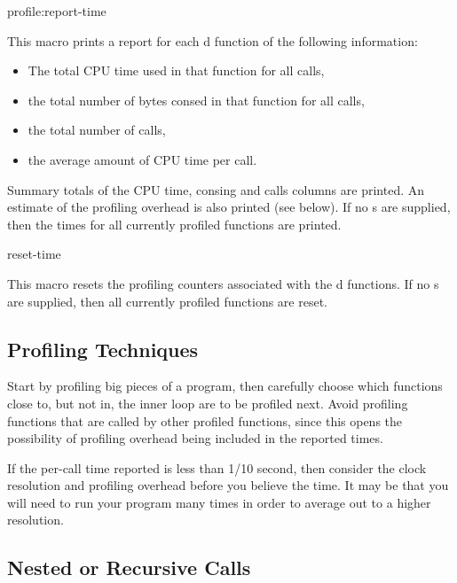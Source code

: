 \begin{defmac}{profile:}{report-time}{}
  
  This macro prints a report for each d function of the
  following information:
  \begin{itemize}
  \item The total CPU time used in that function for all calls,
  
  \item the total number of bytes consed in that function for all
    calls,
  
  \item the total number of calls,
  
  \item the average amount of CPU time per call.
  \end{itemize}
  Summary totals of the CPU time, consing and calls columns are
  printed.  An estimate of the profiling overhead is also printed (see
  below).  If no s are supplied, then the times for all
  currently profiled functions are printed.
\end{defmac}

\begin{defmac}{}{reset-time}{}
  
  This macro resets the profiling counters associated with the
  d functions.  If no s are supplied, then all
  currently profiled functions are reset.
\end{defmac}


\subsection{Profiling Techniques}

Start by profiling big pieces of a program, then carefully choose which
functions close to, but not in, the inner loop are to be profiled next.
Avoid profiling functions that are called by other profiled functions, since
this opens the possibility of profiling overhead being included in the reported
times.

If the per-call time reported is less than 1/10 second, then consider the clock
resolution and profiling overhead before you believe the time.  It may be that
you will need to run your program many times in order to average out to a
higher resolution.


\subsection{Nested or Recursive Calls}

